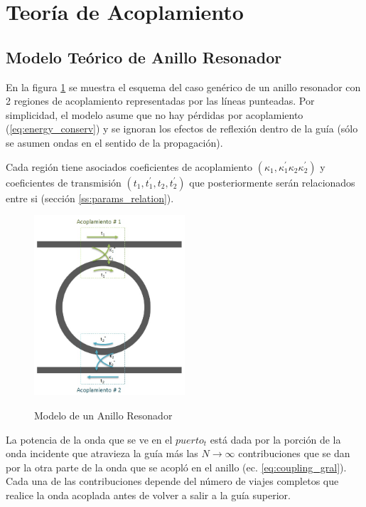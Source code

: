 \section{Teoría de Acoplamiento}
\label{sc:coupling_theory}

\subsection{Modelo Teórico de Anillo Resonador}

En la figura \ref{fig:rr_model} se muestra el esquema del caso genérico de un anillo resonador con 2 regiones de acoplamiento representadas por las líneas punteadas. 
Por simplicidad, el modelo asume que no hay pérdidas por 
acoplamiento (\ref{eq:energy_conserv}) y se ignoran los efectos de reflexión 
dentro de la guía (sólo se asumen ondas en el sentido de la propagación). 

Cada región tiene asociados 
coeficientes de acoplamiento $(\kappa_1,\kappa_1^{'}\kappa_2\kappa_2^{'})$ y
coeficientes de transmisión $(t_1, t_1^{'}, t_2, t_2^{'})$ que posteriormente
serán relacionados entre si (sección \ref{ss:params_relation}).


\begin{figure}[h!]
\caption{Modelo de un Anillo Resonador}
\centering
\includegraphics[width=0.5\textwidth,natwidth=559,natheight=668]{figs/rr_model.jpg}
\label{fig:rr_model}
\end{figure} 


La potencia de la onda que se ve en el $puerto_t$ está dada por la porción de la onda incidente
que atravieza la guía más las $N\to\infty$ contribuciones que se dan por la otra parte de la
onda que se acopló en el anillo (ec. \ref{eq:coupling_gral}). 
Cada una de las contribuciones depende del número de viajes completos que realice la onda
acoplada antes de volver a salir a la guía superior.


